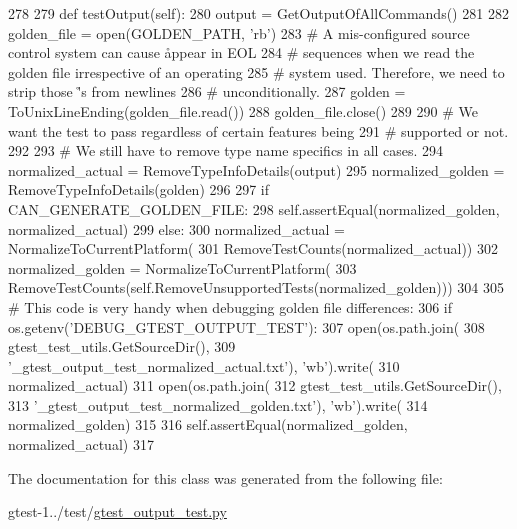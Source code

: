 \begin{DoxyCode}
278 
279   def testOutput(self):
280     output = GetOutputOfAllCommands()
281 
282     golden_file = open(GOLDEN_PATH, 'rb')
283     # A mis-configured source control system can cause \r appear in EOL
284     # sequences when we read the golden file irrespective of an operating
285     # system used. Therefore, we need to strip those \r's from newlines
286     # unconditionally.
287     golden = ToUnixLineEnding(golden_file.read())
288     golden_file.close()
289 
290     # We want the test to pass regardless of certain features being
291     # supported or not.
292 
293     # We still have to remove type name specifics in all cases.
294     normalized_actual = RemoveTypeInfoDetails(output)
295     normalized_golden = RemoveTypeInfoDetails(golden)
296 
297     if CAN_GENERATE_GOLDEN_FILE:
298       self.assertEqual(normalized_golden, normalized_actual)
299     else:
300       normalized_actual = NormalizeToCurrentPlatform(
301           RemoveTestCounts(normalized_actual))
302       normalized_golden = NormalizeToCurrentPlatform(
303           RemoveTestCounts(self.RemoveUnsupportedTests(normalized_golden)))
304 
305       # This code is very handy when debugging golden file differences:
306       if os.getenv('DEBUG_GTEST_OUTPUT_TEST'):
307         open(os.path.join(
308             gtest_test_utils.GetSourceDir(),
309             '_gtest_output_test_normalized_actual.txt'), 'wb').write(
310                 normalized_actual)
311         open(os.path.join(
312             gtest_test_utils.GetSourceDir(),
313             '_gtest_output_test_normalized_golden.txt'), 'wb').write(
314                 normalized_golden)
315 
316       self.assertEqual(normalized_golden, normalized_actual)
317 

\end{DoxyCode}


\-The documentation for this class was generated from the following file\-:\begin{DoxyCompactItemize}
\item 
gtest-\/1../test/\hyperlink{gtest__output__test_8py}{gtest\-\_\-output\-\_\-test.\-py}\end{DoxyCompactItemize}

